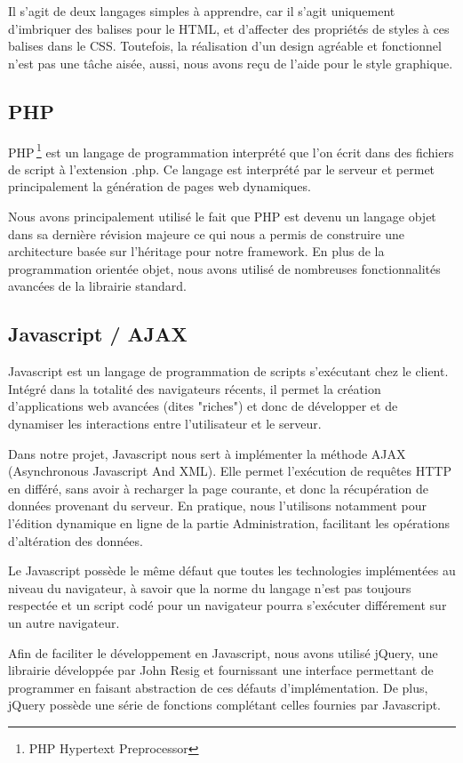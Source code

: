 Il s'agit de deux langages simples à apprendre, car il s'agit uniquement d'imbriquer des
balises pour le HTML, et d'affecter des propriétés de styles à ces balises dans le CSS.
Toutefois, la réalisation d'un design agréable et fonctionnel n'est pas une tâche aisée,
aussi, nous avons reçu de l'aide pour le style graphique.


        \subsection{PHP}
PHP\,\footnote{PHP Hypertext Preprocessor} \cite{php} est un langage de programmation 
interprété que l'on écrit dans des fichiers de script à l'extension .php. Ce 
langage est interprété par le serveur et permet principalement la génération de 
pages web dynamiques.

Nous avons principalement utilisé le fait que PHP est devenu un langage objet dans 
sa dernière révision majeure ce qui nous a permis de construire une architecture
basée sur l'héritage pour notre framework. En plus de la programmation orientée
objet, nous avons utilisé de nombreuses fonctionnalités avancées de la librairie 
standard.


        \subsection{Javascript / AJAX}
Javascript est un langage de programmation de scripts s'exécutant chez le client.
Intégré dans la totalité des navigateurs récents, il permet la création d'applications 
web avancées (dites "riches") et donc de développer et de dynamiser les interactions
entre l'utilisateur et le serveur.

Dans notre projet, Javascript nous sert à implémenter la méthode AJAX (Asynchronous 
Javascript And XML). Elle permet l'exécution de requêtes HTTP en différé, sans 
avoir à recharger la page courante, et donc la récupération de données provenant du 
serveur. En pratique, nous l'utilisons notamment pour l'édition dynamique en ligne 
de la partie Administration, facilitant les opérations d'altération des données.

Le Javascript possède le même défaut que toutes les technologies implémentées au
niveau du navigateur, à savoir que la norme du langage n'est pas toujours respectée 
et un script codé pour un navigateur pourra s'exécuter différement sur un autre
navigateur.

Afin de faciliter le développement en Javascript, nous avons utilisé jQuery, une 
librairie développée par John Resig et fournissant une interface permettant de 
programmer en faisant abstraction de ces défauts d'implémentation. De plus, jQuery 
possède une série de fonctions complétant celles fournies par Javascript.


